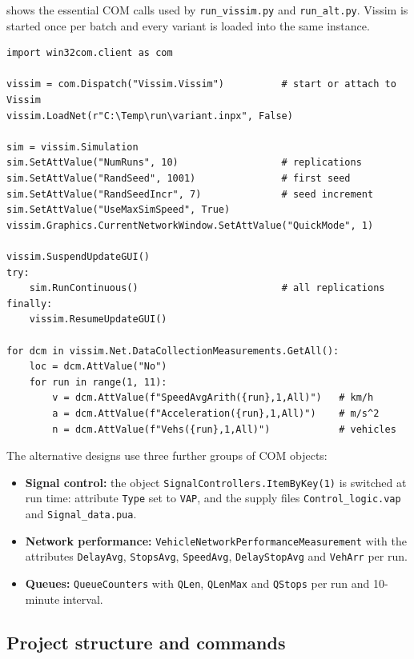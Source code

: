 \documentclass[11pt,a4paper]{article}
\newcommand{\code}[1]{\texttt{#1}}
\begin{document}
 shows the essential COM calls used by \code{run\_vissim.py} and \code{run\_alt.py}.
Vissim is started once per batch and every variant is loaded into the same instance.

\begin{lstlisting}[caption={Essential Vissim COM calls (simplified).},label={lst:com}]
import win32com.client as com

vissim = com.Dispatch("Vissim.Vissim")          # start or attach to Vissim
vissim.LoadNet(r"C:\Temp\run\variant.inpx", False)

sim = vissim.Simulation
sim.SetAttValue("NumRuns", 10)                  # replications
sim.SetAttValue("RandSeed", 1001)               # first seed
sim.SetAttValue("RandSeedIncr", 7)              # seed increment
sim.SetAttValue("UseMaxSimSpeed", True)
vissim.Graphics.CurrentNetworkWindow.SetAttValue("QuickMode", 1)

vissim.SuspendUpdateGUI()
try:
    sim.RunContinuous()                         # all replications
finally:
    vissim.ResumeUpdateGUI()

for dcm in vissim.Net.DataCollectionMeasurements.GetAll():
    loc = dcm.AttValue("No")
    for run in range(1, 11):
        v = dcm.AttValue(f"SpeedAvgArith({run},1,All)")   # km/h
        a = dcm.AttValue(f"Acceleration({run},1,All)")    # m/s^2
        n = dcm.AttValue(f"Vehs({run},1,All)")            # vehicles
\end{lstlisting}

The alternative designs use three further groups of COM objects:
\begin{itemize}
  \item \textbf{Signal control:} the object \code{SignalControllers.ItemByKey(1)} is switched
        at run time: attribute \code{Type} set to \code{VAP}, and the
        supply files \code{Control\_logic.vap} and \code{Signal\_data.pua}.
  \item \textbf{Network performance:} \code{VehicleNetwork}\allowbreak\code{PerformanceMeasurement} with the
        attributes \code{DelayAvg}, \code{StopsAvg}, \code{SpeedAvg}, \code{DelayStopAvg} and
        \code{VehArr} per run.
  \item \textbf{Queues:} \code{QueueCounters} with \code{QLen}, \code{QLenMax} and \code{QStops} per
        run and 10-minute interval.
\end{itemize}

\subsection{Project structure and commands}
\end{document}
